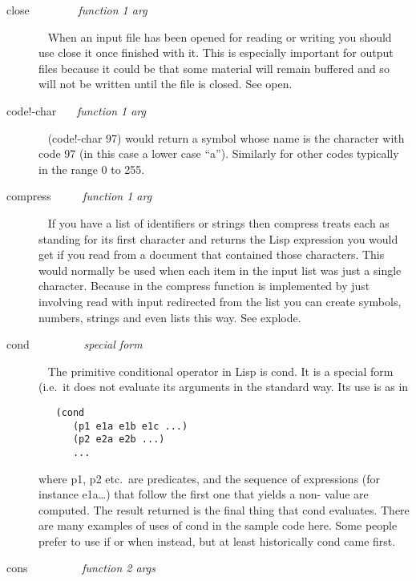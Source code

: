 \begin{description}
\item[{\tx close~~~~~~~~} \hspace{1cm} {\em function 1 arg}]~\newline
When an input file has been opened for reading or writing you should
use {\tx close} it once finished with it. This is especially important
for output files because it could be that some material will remain
buffered and so will not be written until the file is closed. See {\tx open}.
\item[{\tx code!-char~~~} \hspace{1cm} {\em function 1 arg}]~\newline
{\tx (code!-char 97)} would return a symbol whose name is the character
with code 97 (in this case a lower case ``a''). Similarly for other codes
typically in the range 0 to 255.
\item[{\tx compress~~~~~} \hspace{1cm} {\em function 1 arg}]~\newline
If you have a list of identifiers or strings then {\tx compress} treats each
as standing for its first character and returns the Lisp expression you would
get if you read from a document that contained those characters. This
would normally be used when each item in the input list was just a single
character. Because in \vsl{} the {\tx compress} function is implemented by
just involving {\tx read} with input redirected from the list you can create
symbols, numbers, strings and even lists this way. See {\tx explode}.
\item[{\tx cond~~~~~~~~~} \hspace{1cm} {\em special form}]~\newline
The primitive conditional operator in Lisp is {\tx cond}. It is a special
form (i.e.\ it does not evaluate its arguments in the standard way. Its use is
as in
{\small\begin{verbatim}
   (cond
      (p1 e1a e1b e1c ...)
      (p2 e2a e2b ...)
      ...
\end{verbatim}}
\noindent where {\tx p1}, {\tx p2} etc.\ are predicates, and the sequence of
expressions (for instance {\tx e1a\ldots}) that follow the first one that yields
a non-\nil{} value are computed. The result returned is the final thing that
{\tx cond} evaluates. There are many examples of uses of {\tx cond} in the
sample code here. Some people prefer to use {\tx if} or {\tx when} instead,
but at least historically {\tx cond} came first.
\item[{\tx cons~~~~~~~~~} \hspace{1cm} {\em function 2 args}]~\newline

\end{description}
